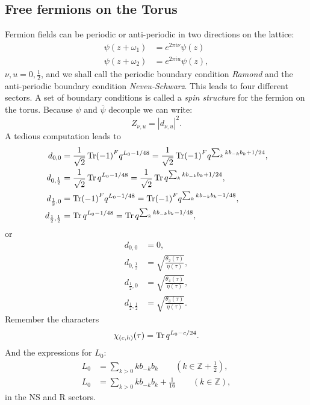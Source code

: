 \documentclass[submission, PhysLectNotes]{SciPost}
\begin{document}
\subsection{Free fermions on the Torus}
Fermion fields can be periodic or anti-periodic in two directions on the lattice:
\begin{align}
	\psi(z+\omega_1) &= e^{2\pi i \nu}\psi(z)\\
	\psi(z+\omega_2) &= e^{2\pi i u}\psi(z),
\end{align}
$\nu, u =0, \frac{1}{2}$, and we shall call the periodic boundary condition \emph{Ramond} and the anti-periodic boundary condition \emph{Neveu-Schwarz}. This leads to four different sectors. A set of boundary conditions is called a \emph{spin structure} for the fermion on the torus. Because $\psi$ and $\bar\psi$ decouple we can write:
\begin{equation}
	Z_{\nu, u} = |d_{\nu, u}|^2.
\end{equation}
A tedious computation leads to
\begin{align}
	d_{0,0} &= \frac{1}{\sqrt{2}}\Tr (-1)^F q^{L_0 - 1/48} = \frac{1}{\sqrt{2}}\Tr (-1)^Fq^{\sum_k kb_{-k}b_k+1/24},\\
	d_{0,\frac{1}{2}} &= \frac{1}{\sqrt{2}}\Tr  q^{L_0 - 1/48} = \frac{1}{\sqrt{2}}\Tr q^{\sum_k kb_{-k}b_k+1/24},\\
	d_{\frac{1}{2},0} &= \Tr (-1)^F q^{L_0 - 1/48} = \Tr (-1)^Fq^{\sum_k kb_{-k}b_k-1/48},\\
	d_{\frac{1}{2},\frac{1}{2}} &= \Tr q^{L_0 - 1/48} = \Tr q^{\sum_k kb_{-k}b_k-1/48},
\end{align}
or
\begin{align}
	d_{0,0} &= 0,\\
	d_{0,\frac{1}{2}} &= \sqrt{\frac{\theta_2(\tau)}{\eta(\tau)}},\\
	d_{\frac{1}{2},0} &= \sqrt{\frac{\theta_4(\tau)}{\eta(\tau)}},\\
	d_{\frac{1}{2},\frac{1}{2}} &= \sqrt{\frac{\theta_3(\tau)}{\eta(\tau)}}.
\end{align}
Remember the characters
\begin{equation}
	\chi_{(c,h)}(\tau) = \Tr q^{L_0 -c/24}.
\end{equation}
And the expressions for $L_0$:
\begin{align}
	L_0 &= \sum_{k>0} kb_{-k}b_k\qquad \left(k\in\mathbb{Z}+\frac{1}{2}\right),\\
	L_0 &= \sum_{k>0} kb_{-k}b_k + \frac{1}{16}\qquad \left(k\in\mathbb{Z}
	\right),
\end{align}
in the NS and R sectors.
\end{document}
